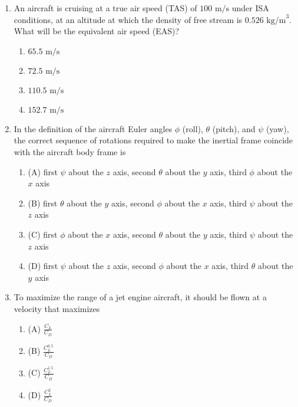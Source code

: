 \documentclass[journal]{IEEEtran}
\begin{document}
\begin{enumerate}[start=35]
\begin{enumerate}
\end{enumerate}
\item An aircraft is cruising at a true air speed (TAS) of $100 \text{ m/s}$ under ISA conditions, at an altitude at which the density of free stream is $0.526 \text{ kg/m}^3$. What will be the equivalent air speed (EAS)?
\begin{enumerate}
    \item $65.5 \text{ m/s}$
    \item $72.5 \text{ m/s}$
    \item $110.5 \text{ m/s}$
    \item $152.7 \text{ m/s}$
\end{enumerate}
\item In the definition of the aircraft Euler angles $\phi$ (roll), $\theta$ (pitch), and $\psi$ (yaw), the correct sequence of rotations required to make the inertial frame coincide with the aircraft body frame is
\begin{enumerate}
    \item (A) first $\psi$ about the $z$ axis, second $\theta$ about the $y$ axis, third $\phi$ about the $x$ axis
    \item (B) first $\theta$ about the $y$ axis, second $\phi$ about the $x$ axis, third $\psi$ about the $z$ axis
    \item (C) first $\phi$ about the $x$ axis, second $\theta$ about the $y$ axis, third $\psi$ about the $z$ axis
    \item (D) first $\psi$ about the $z$ axis, second $\phi$ about the $x$ axis, third $\theta$ about the $y$ axis
\end{enumerate}

\item To maximize the range of a jet engine aircraft, it should be flown at a velocity that maximizes
\begin{enumerate}
    \item (A) $\frac{C_L}{C_D}$
    \item (B) $\frac{C_{L}^{0.5}}{C_D}$
    \item (C) $\frac{C_{L}^{1.5}}{C_D}$
    \item (D) $\frac{C_{L}^{2}}{C_{D}}$
\end{enumerate}


\end{enumerate}
\end{document}
